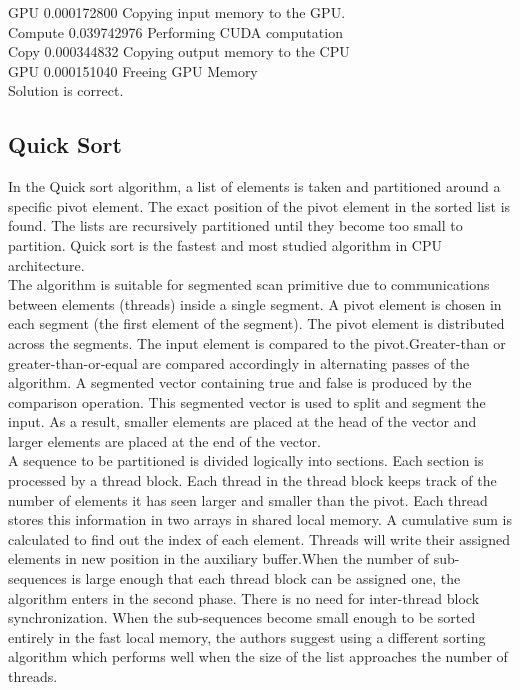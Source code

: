 \documentclass[conference]{IEEEtran}
\begin{document}
 GPU     0.000172800 Copying input memory to the GPU.\\

 Compute 0.039742976 Performing CUDA computation\\

 Copy    0.000344832 Copying output memory to the CPU\\

 GPU    0.000151040 Freeing GPU Memory\\

 Solution is correct.\\

\subsection{Quick Sort}
In the Quick sort algorithm, a list of elements is taken and partitioned around a specific pivot element. The exact position of the pivot element in the sorted list is found. The lists are recursively partitioned until they become too small to partition. Quick sort is the fastest and most studied algorithm in CPU architecture.\\

The algorithm is suitable for segmented
scan primitive due to communications between elements (threads) inside a
single segment. A pivot element is chosen in each segment (the first element of the
segment). The pivot element is distributed across the segments. The input element is
compared to the pivot.Greater-than or greater-than-or-equal are compared accordingly
in alternating passes of the algorithm. A segmented vector containing true and false
is produced by the comparison operation. This segmented vector is used to split and segment the input. As a result, smaller elements are placed at the head of the vector
and larger elements are placed at the end of the vector. \\

A sequence to be partitioned is divided logically into sections. Each section is
processed by a thread block. Each thread in the thread block keeps track of the number
of elements it has seen larger and smaller than the pivot. Each thread stores this
information in two arrays in shared local memory. A cumulative sum is calculated to
find out the index of each element. Threads will write their assigned elements in new
position in the auxiliary buffer.When the number of sub-sequences is large enough that
each thread block can be assigned one, the algorithm enters in the second phase. There
is no need for inter-thread block synchronization. When the sub-sequences become
small enough to be sorted entirely in the fast local memory, the authors suggest using
a different sorting algorithm which performs well when the size of the list approaches
the number of threads.\\
\end{document}
